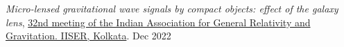 \begin{itemize}[noitemsep]
{
\item \textit{Micro-lensed gravitational wave signals by compact objects: effect of the galaxy lens}, \href{https://www.iiserkol.ac.in/~iagrg32/}{32nd meeting of the Indian Association for General Relativity and Gravitation. IISER, Kolkata}. \hfill{Dec 2022}
}\end{itemize}
